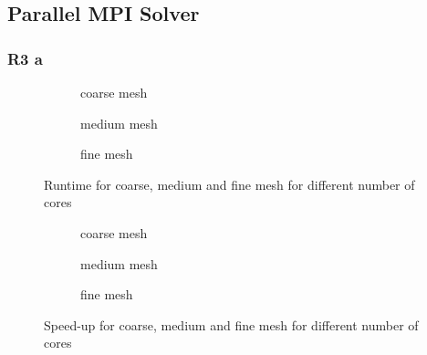 \documentclass[a4paper, 11pt, oneside]{scrartcl}
\begin{document}
\subsection{Parallel MPI Solver}

\subsubsection*{R3 a}

\begin{figure}[h!]
	\centering
	\begin{subfigure}{0.32\textwidth}
		\centering
		\resizebox{0.33\width}{!}{}
		\caption{\label{fig::RcoarseMPI} coarse mesh}
	\end{subfigure}
	\hfill
	\begin{subfigure}{0.32\textwidth}
		\centering
		\resizebox{0.33\width}{!}{}
		\caption{\label{fig::RmediumMPI} medium mesh}
	\end{subfigure}
	\hfill
	\begin{subfigure}{0.32\textwidth}
		\centering
		\resizebox{0.33\width}{!}{}
		\caption{\label{fig::RfineMPI} fine mesh}
	\end{subfigure}
	\caption{\label{fig::RuntimeMPI} Runtime for coarse, medium and fine mesh for different number of cores}
\end{figure}

\begin{figure}[h!]
	\centering
	\begin{subfigure}{0.32\textwidth}
		\centering
		\resizebox{0.33\width}{!}{}
		\caption{\label{fig::SPcoarseMPI} coarse mesh}
	\end{subfigure}
	\hfill
	\begin{subfigure}{0.32\textwidth}
		\centering
		\resizebox{0.33\width}{!}{}
		\caption{\label{fig::SPmediumMPI} medium mesh}
	\end{subfigure}
	\hfill
	\begin{subfigure}{0.32\textwidth}
		\centering
		\resizebox{0.33\width}{!}{}
		\caption{\label{fig::SPfineMPI} fine mesh}
	\end{subfigure}
	\caption{\label{fig::SpeedUpMPI} Speed-up for coarse, medium and fine mesh for different number of cores}
\end{figure}
\end{document}
